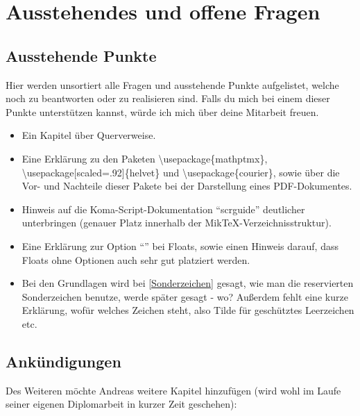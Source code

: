 %
%

\chapter{Ausstehendes und offene Fragen}
\label{sec:ausstehendes}

\section{Ausstehende Punkte}

Hier werden unsortiert alle Fragen und ausstehende Punkte aufgelistet, welche noch zu beantworten oder zu realisieren sind. Falls du mich bei einem dieser Punkte unterstützen kannst, würde ich mich über deine Mitarbeit freuen.

\begin{itemize}
	\item Ein Kapitel über Querverweise.
	\item Eine Erklärung zu den Paketen \textbackslash use\-package\{mathptmx\},\\ \textbackslash usepackage[scaled=.92]\{helvet\} und \textbackslash usepackage\{courier\}, sowie über die
	Vor- und Nachteile dieser Pakete bei der Darstellung eines PDF-Dokumentes.
	\item Hinweis auf die Koma-Script-Dokumentation \enquote{scrguide} deutlicher unterbringen (genauer Platz innerhalb der MikTeX-Verzeichnisstruktur).
	\item Eine Erklärung zur Option \enquote{\!} bei Floats, sowie einen Hinweis darauf, dass Floats ohne Optionen auch sehr gut platziert werden.
	\item Bei den Grundlagen wird bei \ref{Sonderzeichen} gesagt, wie man die reservierten Sonderzeichen benutze, werde später gesagt - wo? Außerdem fehlt eine kurze Erklärung, wofür welches Zeichen steht, also Tilde für geschütztes Leerzeichen etc.
\end{itemize}

\section{Ankündigungen}

Des Weiteren möchte Andreas weitere Kapitel hinzufügen (wird wohl im Laufe seiner eigenen Diplomarbeit
in kurzer Zeit geschehen):

